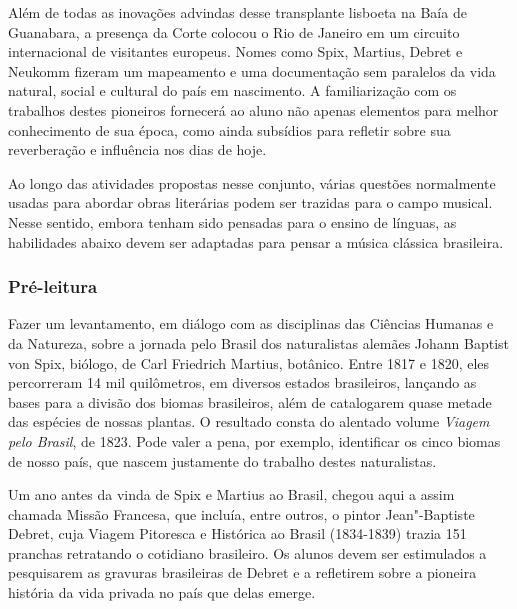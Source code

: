 \documentclass[11pt]{extarticle}
\begin{document}
Além de todas as inovações advindas desse transplante lisboeta na Baía de
Guanabara, a presença da Corte colocou o Rio de Janeiro em um circuito
internacional de visitantes europeus. Nomes como Spix, Martius, Debret e
Neukomm fizeram um mapeamento e uma documentação sem paralelos da vida natural,
social e cultural do país em nascimento. A familiarização com os trabalhos
destes pioneiros fornecerá ao aluno não apenas elementos para melhor
conhecimento de sua época, como ainda subsídios para refletir sobre sua
reverberação e influência nos dias de hoje.

Ao longo das atividades propostas nesse conjunto, várias questões normalmente usadas para abordar obras literárias podem ser trazidas para o campo musical. Nesse sentido, embora tenham sido pensadas para o ensino de línguas, as habilidades abaixo devem ser adaptadas para pensar a música clássica brasileira.



\subsubsection{Pré-leitura}

Fazer um levantamento, em diálogo com as disciplinas das Ciências Humanas e da Natureza, sobre a jornada pelo Brasil dos naturalistas alemães Johann
Baptist von Spix, biólogo, de Carl Friedrich Martius, botânico. Entre 1817 e
1820, eles percorreram 14 mil quilômetros, em diversos estados brasileiros,
lançando as bases para a divisão dos biomas brasileiros, além de catalogarem
quase metade das espécies de nossas plantas. O resultado consta do alentado
volume \emph{Viagem pelo Brasil}, de 1823. Pode valer a pena, por exemplo, identificar
os cinco biomas de nosso país, que nascem justamente do trabalho destes
naturalistas.

Um ano antes da vinda de Spix e Martius ao Brasil, chegou aqui a assim chamada
Missão Francesa, que incluía, entre outros, o pintor Jean"-Baptiste Debret, cuja
Viagem Pitoresca e Histórica ao Brasil (1834-1839) trazia 151 pranchas
retratando o cotidiano brasileiro. Os alunos devem ser estimulados a
pesquisarem as gravuras brasileiras de Debret e a refletirem sobre a pioneira
história da vida privada no país que delas emerge.
\end{document}
